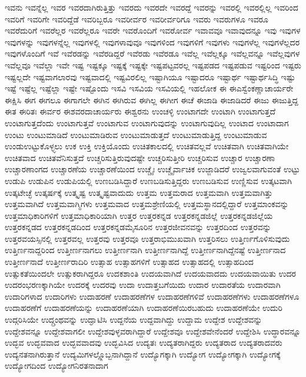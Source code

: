 {ಇವನು
ಇವನ್ನೆಲ್ಲ
ಇವರ
ಇವರದಾಗಿರುತ್ತಿತ್ತು
ಇವರದು
ಇವರದೇ
ಇವರದ್ದೆ
ಇವರನ್ನು
ಇವರಲ್ಲಿ
ಇವರಲ್ಲಿಲ್ಲ
ಇವರಿಂದ
ಇವರಿಗೆ
ಇವರಿಗೇ
ಇವರಿದ್ದೆಡೆ
ಇವರಿಬ್ಬರೂ
ಇವರೀರ್ವರ
ಇವರೀರ್ವರಿಗೂ
ಇವರು
ಇವರುಗಳೂ
ಇವರೂ
ಇವರೆದುರಿಗೆ
ಇವರೆಲ್ಲರ
ಇವರೆಲ್ಲರೂ
ಇವರೇ
ಇವರೊಂದಿಗೆ
ಇವರೋರ್ವ
ಇವಾವವೂ
ಇವಾವುದನ್ನೂ
ಇವು
ಇವುಗಳ
ಇವುಗಳನ್ನು
ಇವುಗಳನ್ನೆಲ್ಲ
ಇವುಗಳಲ್ಲಿ
ಇವುಗಳಾವುವೂ
ಇವುಗಳಿಂದ
ಇವುಗಳಿಗೆ
ಇವುಗಳು
ಇವುಗಳೆಲ್ಲ
ಇವುಗಳೆಲ್ಲದರ
ಇವುಗಳೊಂದಿಗೆ
ಇವೆ
ಇವೆರಡನ್ನು
ಇವೆರಡಿದ್ದರೆ
ಇವೆರಡು
ಇವೆರಡೂ
ಇವೆಲ್ಲ
ಇವೆಲ್ಲಕ್ಕೂ
ಇವೆಲ್ಲವನ್ನೂ
ಇವೆಲ್ಲವುಗಳ
ಇವೆಲ್ಲವೂ
ಇವೆಲ್ಲಾ
ಇವೇ
ಇಷ್ಟ
ಇಷ್ಟಕ್ಕೂ
ಇಷ್ಟಕ್ಕೆ
ಇಷ್ಟಕ್ಕೇ
ಇಷ್ಟಪಟ್ಟವರಲ್ಲ
ಇಷ್ಟಪಡದ
ಇಷ್ಟಪಡುವ
ಇಷ್ಟರಿಂದ
ಇಷ್ಟರು
ಇಷ್ಟಲ್ಲದೇ
ಇಷ್ಟವಾಗಲಾರವು
ಇಷ್ಟವಾದಲ್ಲಿ
ಇಷ್ಟವಿರಲಿಲ್ಲ
ಇಷ್ಟಾಗಿಯೂ
ಇಷ್ಟಾದರೂ
ಇಷ್ಟಾರ್ಥ
ಇಷ್ಟಾರ್ಥಸಿದ್ಧಿ
ಇಷ್ಟು
ಇಷ್ಟೆ
ಇಷ್ಟೆಲ್ಲ
ಇಷ್ಟೆಲ್ಲಾ
ಇಷ್ಟೇ
ಇಷ್ಟೊಂದು
ಇಸವಿ
ಇಸವಿಯ
ಇಸವಿಯಲ್ಲಿ
ಇಹಲೋಕ
ಈ
ಈಎಸ್ವೆಂಕಣ್ಣಾಚಾರ್ಯರೇ
ಈಕ್ಷಿಸಿ
ಈಗ
ಈಗಲೂ
ಈಗಾಗಲೇ
ಈಗಿನ
ಈಗಿರುವ
ಈಗಿಲ್ಲ
ಈಗೀಗ
ಈಚೆ
ಈಜಾಡಿ
ಈಜಾಡಿದರೆ
ಈಜು
ಈಜುತ್ತಿದ್ದ
ಈತ
ಈರಿತಃ
ಈರ್ವರ
ಈಶವರದಾಚಾರ್ಯರು
ಈಶ್ವರನು
ಉಂಚಳ್ಳಿ
ಉಂಟಾಗದೇ
ಉಂಟಾಗಿ
ಉಂಟಾಗುತ್ತದೆ
ಉಂಟಾಗುತ್ತದೆಂದು
ಉಂಟಾಗುತ್ತವೆ
ಉಂಟಾಗುವ
ಉಂಟಾಗುವುದನ್ನು
ಉಂಟಾಗುವುದಿಲ್ಲ
ಉಂಟಾದ
ಉಂಟಾದಾಗ
ಉಂಟು
ಉಂಟುಮಾಡಿದೆ
ಉಂಟುಮಾಡಿರುವ
ಉಂಟುಮಾಡುತ್ತದೆ
ಉಂಟುಮಾಡುತ್ತಿದ್ದ
ಉಂಟುಮಾಡುವ
ಉಂಡುಉಟ್ಟುಕೊಳ್ಳ್ಳಲು
ಉಕ
ಉಕ್ತಿ
ಉಕ್ತಿಯೊಂದು
ಉಚಿತಕಾಲದಲ್ಲಿ
ಉಚಿತವಲ್ಲವೆ
ಉಚಿತವಾಗಿ
ಉಚಿತವಾಗಿಯೇ
ಉಚಿತವಾದ
ಉಚಿತವೆನಿಸುತ್ತದೆ
ಉಚ್ಚರಿಸುತ್ತಿರುವುದಷ್ಟೇ
ಉಚ್ಚರಿಸುತ್ತೀರಿ
ಉಚ್ಚರಿಸುವ
ಉಚ್ಚಾರ
ಉಚ್ಚಾರಣಾ
ಉಚ್ಚಾರಣಾಂಗದ
ಉಚ್ಚಾರಣೆಯ
ಉಚ್ಚಾರಣೆಯಿಂದ
ಉಚ್ಚೈಃ
ಉಚ್ಚೈರ್ವಾಚಿಕ
ಉಜ್ಜಾಡಿದರೆ
ಉಜ್ವಲವಾಗುವಂತೆ
ಉಟ್ಟು
ಉಡುಪಿ
ಉಡುಪಿನ
ಉಡುಪಿಯಲ್ಲಿ
ಉಣಬಡಿಸಿದ್ದಾರೆ
ಉಣಬಡಿಸುತ್ತಿದ್ದರು
ಉಣಬಡಿಸುವ
ಉಣ್ಣಿಸುವ
ಉತ್ಕಟವಾಗಿ
ಉತ್ಕಟೇಚ್ಛೆ
ಉತ್ಕರ್ಷಕ್ಕೆ
ಉತ್ಕೃಷ್ಟ
ಉತ್ಕೃಷ್ಟವಾದುದು
ಉತ್ತಮ
ಉತ್ತಮರಾದ
ಉತ್ತಮವಾಗಿ
ಉತ್ತಮವಾಗಿತ್ತು
ಉತ್ತಮವಾಗಿದೆ
ಉತ್ತಮವಾಗ್ಮಿಗಳು
ಉತ್ತಮವಾದ
ಉತ್ತಮಶ್ರೇಣಿಯಲ್ಲಿ
ಉತ್ತಮಸ್ಥಾನದಲ್ಲಿದ್ದಾರೆ
ಉತ್ತಮಾಂಕವನ್ನು
ಉತ್ತಮಾಧಿಕಾರಿಗಳಿಗೆ
ಉತ್ತಮಾಧಿಕಾರಿಯಾಗಿ
ಉತ್ತರ
ಉತ್ತರಕನ್ನಡ
ಉತ್ತರಕನ್ನಡಜಿಲ್ಲೆ
ಉತ್ತರಕನ್ನಡಜಿಲ್ಲೆಯ
ಉತ್ತರಕನ್ನಡದ
ಉತ್ತರಕನ್ನಡದಿಂದ
ಉತ್ತರಕನ್ನಡಮೈಸೂರಿನ
ಉತ್ತರಜೀವನವನ್ನು
ಉತ್ತರದಿಂದ
ಉತ್ತರವನ್ನು
ಉತ್ತರವಯಸ್ಸಿನಲ್ಲಿ
ಉತ್ತರವಲ್ಲ
ಉತ್ತರವು
ಉತ್ತರವೂ
ಉತ್ತರಾಭಿಮುಖವಾಗಿ
ಉತ್ತರಿಸಲು
ಉತ್ತಿರ್ಣಗೊಳಿಸುವುದು
ಉತ್ತಿರ್ಣನಾದ್ದರಿಂದ
ಉತ್ತೀರ್ಣನಾಗಲು
ಉತ್ತೀರ್ಣನಾಗಿ
ಉತ್ತೀರ್ಣನಾಗಿದ್ದೆ
ಉತ್ತೀರ್ಣನಾಗಿದ್ದೆನಷ್ಟೆ
ಉತ್ತೀರ್ಣನಾದ
ಉತ್ತೀರ್ಣನಾದೆ
ಉತ್ತೀರ್ಣರಾದಿರಿ
ಉತ್ಸಾಹ
ಉತ್ಸಾಹಗಳಿಗೆ
ಉತ್ಸಾಹದ
ಉತ್ಸಾಹದಲ್ಲಿ
ಉತ್ಸಾಹದಿಂದ
ಉತ್ಸುಕತೆಯಿಂದಲೇ
ಉತ್ಸುಕರಾಗಿದ್ದರೂ
ಉದಕಶಾಂತಿ
ಉದಯವಾಗಿದೆ
ಉದಯವಾದದು
ಉದಯವಾಯಿತು
ಉದರ
ಉದರಂಭರಣಕ್ಕಾಗಿಯೇ
ಉದರಕ್ಕೆ
ಉದರವು
ಉದಾ
ಉದಾತ್ತಬಗೆಯಿದು
ಉದಾರ
ಉದಾರತೆಯ
ಉದಾರವಾಗಿ
ಉದಾರಿಗಳಾದ
ಉದಾರಿಗಳು
ಉದಾಹರಣೆ
ಉದಾಹರಣೆಗಳ
ಉದಾಹರಣೆಗಳಿವೆ
ಉದಾಹರಣೆಗಳು
ಉದಾಹರಣೆಗಳೂ
ಉದಾಹರಣೆಗೆ
ಉದಾಹರಣೆಯನ್ನು
ಉದಾಹರಣೆಯಾಗಿ
ಉದಾಹರಣೆಯಿರಬಹುದು
ಉದಾಹರಣೆಯೇ
ಉದುರಿ
ಉದ್ಗರಿಸಿಯೇ
ಉದ್ಗ್ರಂಥವನ್ನು
ಉದ್ಘಾಟಿಸಿ
ಉದ್ದನೆಯ
ಉದ್ದವಾಗಿದ್ದು
ಉದ್ದಾಮ
ಉದ್ದೇಶ
ಉದ್ದೇಶವನ್ನು
ಉದ್ದೇಶವನ್ನೂ
ಉದ್ದೇಶವಾಗಲೀ
ಉದ್ದೇಶವುಳ್ಳವರಾಗಿದ್ದಾರೆ
ಉದ್ದೇಶವೂ
ಉದ್ದೇಶವೇನೆಂದರೆ
ಉದ್ದೇಶಿಸಿ
ಉದ್ಧಾರವನ್ನೂ
ಉದ್ಭವ
ಉದ್ಭವವಾದ
ಉದ್ಭವವಾದವು
ಉದ್ಭವಿಸಿದ
ಉದ್ಯತಃ
ಉದ್ಯತರಾಗಿದ್ದರು
ಉದ್ಯತರಾದ
ಉದ್ಯತರಾದವರು
ಉದ್ಯನತನಾಗಿರುತ್ತಾನೆ
ಉದ್ಯಮಿಗಳಲ್ಲ್ಲೊಬ್ಬನಾಗಿದ್ದಾನೆ
ಉದ್ಯೊಗಕ್ಕಾಗಿ
ಉದ್ಯೋಗ
ಉದ್ಯೋಗಕ್ಕಾಗಿ
ಉದ್ಯೋಗಕ್ಕೆ
ಉದ್ಯೋಗದಿಂದ
ಉದ್ಯೋಗನಿರತನಾದಾಗ
}
